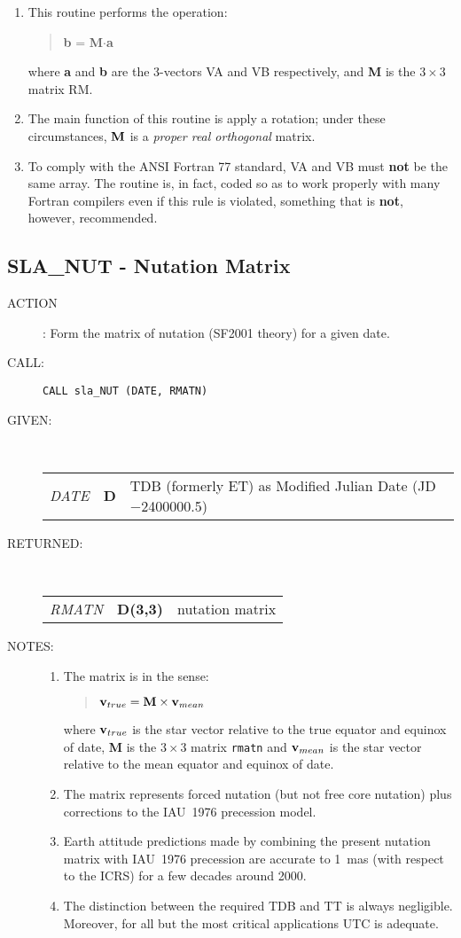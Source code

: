 \documentclass[11pt,twoside]{article}
\newcommand{\xlabel}[1]{}
\newcommand{\routine}[3]
{\hbadness=10000
  \vbox
  {
    \rule{\textwidth}{0.3mm}\\
    {\Large {\bf #1} \hfill #2 \hfill {\bf #1}}\\
    \setlength{\oldspacing}{\topsep}
    \setlength{\topsep}{0.3ex}
    \begin{description}
      #3
    \end{description}
    \setlength{\topsep}{\oldspacing}
  }
}
\renewcommand{\routine}[3]
   {
      \subsection{#1\xlabel{#1} - #2\label{#1}}
       \begin{description}
         #3
       \end{description}
   }
\newcommand{\action}[1]
{\item[ACTION]: #1}
\newcommand{\action}[1]
   {\item[ACTION:] #1}
\newcommand{\call}[1]
{\item[CALL]: \hspace{0.4em}{\tt #1}}
\newlength{\oldspacing}
\renewcommand{\call}[1]
   {
    \item[CALL:] {\tt #1}
   }
\newcommand{\args}[2]
{
  \goodbreak
  \setlength{\oldspacing}{\topsep}
  \setlength{\topsep}{0.3ex}
  \begin{description}
  \item[#1]:\\[1.5ex]
    \begin{tabular}{p{7em}p{6em}p{22em}}
      #2
    \end{tabular}
  \end{description}
  \setlength{\topsep}{\oldspacing}
}
\renewcommand{\args}[2]
   {
     \begin{description}
        \item[#1:]\\
        \begin{tabular}{p{7em}p{6em}l}
           #2
        \end{tabular}
     \end{description}
   }
\newcommand{\spec}[3]
{
  {\em {#1}} & {\bf \mbox{#2}} & {#3}
}
\newcommand{\notes}[1]
{
  \goodbreak
  \setlength{\oldspacing}{\topsep}
  \setlength{\topsep}{0.3ex}
  \begin{description}
    \item[NOTES]:
        #1
  \end{description}
  \setlength{\topsep}{\oldspacing}
}
\renewcommand{\notes}[1]
   {
      \begin{description}
         \item[NOTES:]
            #1
      \end{description}
   }
\begin{document}
{
 \begin{enumerate}
  \item This routine performs the operation:
        \begin{verse}
         {\bf b} = {\bf M}$\cdot${\bf a}
        \end{verse}
        where {\bf a} and {\bf b} are the 3-vectors VA and VB
        respectively, and {\bf M} is the $3\times3$ matrix RM.
  \item The main function of this routine is apply a
        rotation;  under these circumstances, ${\bf M}$ is a
        {\it proper real orthogonal}\/ matrix.
  \item To comply with the ANSI Fortran 77 standard, VA and VB must
        {\bf not} be the same array.  The routine is, in fact, coded
        so as to work properly with many Fortran compilers even
        if this rule is violated, something that is {\bf not}, however,
        recommended.
 \end{enumerate}
}
\routine{SLA\_NUT}{Nutation Matrix}
{
 \action{Form the matrix of nutation (SF2001 theory) for a given date.}
 \call{CALL sla\_NUT (DATE, RMATN)}
}
\args{GIVEN}
{
 \spec{DATE}{D}{TDB (formerly ET) as Modified Julian Date
                                          (JD$-$2400000.5)}
}
\args{RETURNED}
{
 \spec{RMATN}{D(3,3)}{nutation matrix}
}
\notes{
 \begin{enumerate}
  \item The matrix is in the sense:
        \begin{verse}
         ${\bf v}_{true} = {\bf M}\times{\bf v}_{mean}$
        \end{verse}
        where ${\bf v}_{true}$ is the star vector relative to the
        true equator and equinox of date, {\bf M} is the
        $3\times3$ matrix {\tt rmatn} and
        ${\bf v}_{mean}$ is the star vector relative to the
        mean equator and equinox of date.
  \item The matrix represents forced nutation (but not free core nutation)
        plus corrections to the IAU~1976 precession model.
  \item Earth attitude predictions made by combining the present nutation
        matrix with IAU~1976 precession are accurate to 1~mas (with respect
        to the ICRS) for a few decades around 2000.
  \item The distinction between the required TDB and TT is
        always negligible.  Moreover, for all but the most
        critical applications UTC is adequate.
 \end{enumerate}
}
\end{document}
